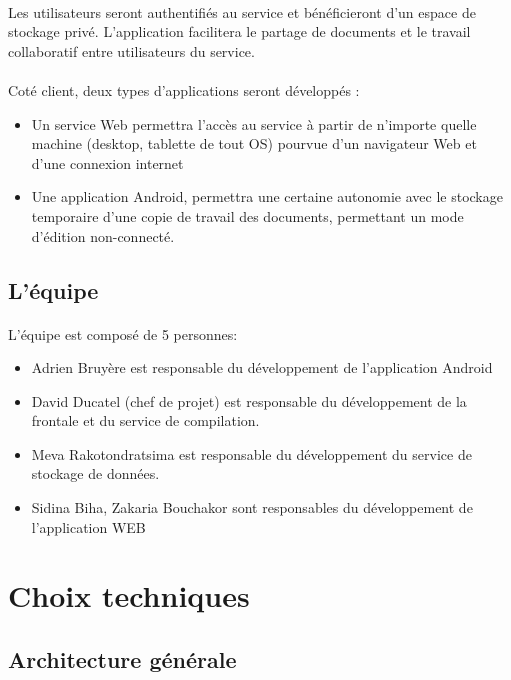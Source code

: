 \documentclass[a4paper,12pt]{article}
\begin{document}
\paragraph*{}
Les utilisateurs seront authentifiés au service et bénéficieront d'un espace
de stockage privé. L'application facilitera le partage de documents et le
travail collaboratif entre utilisateurs du service.
\paragraph*{} 
Coté client, deux types d'applications seront développés :

\begin{itemize}
 \item Un service Web permettra l'accès au service à partir de n'importe
quelle machine (desktop, tablette de tout OS) pourvue d'un navigateur
Web et d'une connexion internet

 \item Une application Android, permettra une certaine autonomie avec le
stockage temporaire d'une copie de travail des documents, permettant
un mode d'édition non-connecté.
\end{itemize}

\subsection{L'équipe}
\paragraph*{}
L'équipe est composé de 5 personnes:
\begin{itemize}
 \item Adrien Bruyère est responsable du développement de l'application Android
 \item David Ducatel (chef de projet) est responsable du développement de la frontale et du service de compilation.
 \item Meva Rakotondratsima est responsable du développement du service de stockage de données.
 \item Sidina Biha, Zakaria Bouchakor sont responsables du développement de l'application WEB
\end{itemize}

\newpage
\section{Choix techniques}
\subsection{Architecture générale}
\end{document}
